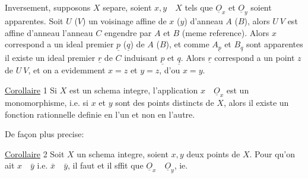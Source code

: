 Inversement, supposons \(X\) separe, soient \(x,y\quad X\) tels que \(\underline O_x\) et \(\underline O_y\) soient apparentes. Soit \(U\) (\(V\)) un voisinage affine de \(x\) (\(y\)) d'anneau \(A\) (\(B\)), alors \(U\ V\) est affine d'anneau l'anneau \(C\) engendre par \(A\) et \(B\) (meme reference).  Alors \(x\) correspond a un ideal premier \(\underline p\) (\(\underline q\)) de \(A\) (\(B\)), et comme  \(A_{\underline p}\) et \(B_{\underline q}\) sont apparentes il existe un ideal premier \(\underline r\) de \(C\) induisant \(\underline p\) et \(\underline q\). Alors \(\underline r\) correspond a un point \(z\) de \(U\ V\), et on a evidemment \(x=z\) et \(y=z\), d'ou \(x=y\).

\uline{Corollaire} 1 Si \(X\) est un schema integre, l'application \(x\quad\underline O_x\) est un monomorphisme, i.e. si \(x\) et \(y\) sont des points distincts de \(X\), alors il existe un fonction rationnelle definie en l'un et non en l'autre.

De façon plus precise:

\uline{Corollaire} 2 Soit \(X\) un schema integre, soient \(x,y\) deux points de \(X\). Pour qu'on ait \(x\quad\bar y\) i.e. \(\bar x\quad\bar y\), il faut et il sffit que \(\underline O_x\quad\underline O_y\), ie.
